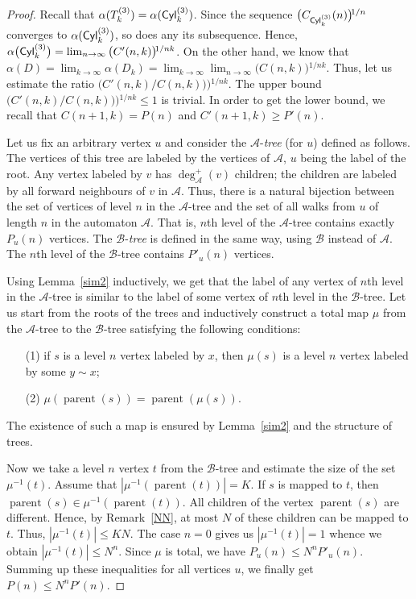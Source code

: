 \documentclass[submission,copyright]{eptcs}\providecommand{\event}{WORDS 2011}
\DeclareMathOperator{\parent}{parent}
\def\A{{\mathcal A}}
\def\B{{\mathcal B}}
\def\Cyl{{\sf Cyl}}
\begin{document}
\begin{proof} 
Recall that $\alpha(T_k^{(3)})=\alpha(\Cyl_k^{(3)})$. Since the sequence $\big(C_{\Cyl_k^{(3)}}(n)\big)\!^{1/n}$ converges to $\alpha(\Cyl_k^{(3)})$, so does any its subsequence. Hence, $\alpha\big(\Cyl_k^{(3)}\big)=\lim_{n\to\infty}{\big(C'(n,k)\big)\!^{1/nk}}$. On the other hand, we know that $\alpha(D)=\lim_{k\to\infty}\alpha(D_k)=\lim_{k\to\infty}\lim_{n\to\infty}{\big(C(n,k)\big)\!^{1/nk}}$. Thus, let us estimate the ratio $\big({C'(n,k)}/C(n,k))\big)\!^{1/nk}$. The upper bound $\big({C'(n,k)}/C(n,k))\big)\!^{1/nk}\!\leq 1$ is trivial. In order to get the lower bound, we recall that $C(n{+}1,k)=P(n)$ and $C'(n{+}1,k)\geq P'(n)$. 

Let us fix an arbitrary vertex $u$ and consider the $\A$-\textit{tree} (for $u$) defined as follows. The vertices of this tree are labeled by the vertices of $\A$, $u$ being the label of the root. Any vertex labeled by $v$ has $\deg_{\A}^+(v)$ children; the children are labeled by all forward neighbours of $v$ in $\A$. Thus, there is a natural bijection between the set of vertices of level $n$ in the $\A$-tree and the set of all walks from $u$ of length $n$ in the automaton $\A$. That is, $n$th level of the $\A$-tree contains exactly $P_u(n)$ vertices. The $\B$-\textit{tree} is defined in the same way, using $\B$ instead of $\A$. The $n$th level of the $\B$-tree contains $P'_u(n)$ vertices.

Using Lemma~\ref{sim2} inductively, we get that the label of any vertex of $n$th level in the $\A$-tree is similar to the label of some vertex of $n$th level in the $\B$-tree. Let us start from the roots of the trees and inductively construct a total map $\mu$ from the $\A$-tree to the $\B$-tree satisfying the following conditions:
\begin{itemize}
\item[(1)] if $s$ is a level $n$ vertex labeled by $x$, then $\mu(s)$ is a level $n$ vertex labeled by some $y\sim x$;
\item[(2)] $\mu(\parent(s))=\parent(\mu(s))$.
\end{itemize}
The existence of such a map is ensured by Lemma~\ref{sim2} and the structure of trees. 

Now we take a level $n$ vertex $t$ from the $\B$-tree and estimate the size of the set $\mu^{-1}(t)$. Assume that $|\mu^{-1}(\parent(t))|=K$. If $s$ is mapped to $t$, then $\parent(s)\in\mu^{-1}(\parent(t))$. All children of the vertex $\parent(s)$ are different. Hence, by Remark~\ref{NN}, at most $N$ of these children can be mapped to $t$. Thus, $|\mu^{-1}(t)|\le KN$. The case $n=0$ gives us $|\mu^{-1}(t)|=1$ whence we obtain $|\mu^{-1}(t)|\le N^n$. Since $\mu$ is total, we have $P_u(n)\le N^nP'_u(n)$. Summing up these inequalities for all vertices $u$, we finally get $P(n)\le N^nP'(n)$.


\end{proof}
\end{document}
